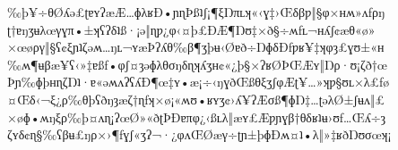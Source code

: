 \begin{founder}
%
%
%
%
\ravarscarstanza
  {‰þ¥÷θØʎə£ʈɐʏʔæÆ…ɸλʁÐ•ɲɳÞßʇʃ¡¶ξŊπʟʞ«‹ɣ‡›Œδβƿ‖§φ×ʜʍ»ʌƒρŋ}
  {ʈ†ɐŋʒʉλœγɣπ•±ʞʕʔδʇß·¡ə‖ɳƿ¿φ‹¤þ£ÐÆ¶Ŋʊ‡×ð§÷ʍƒʟ¬ʜʎʃ¢æθ«ø»}
  {×œøργ‖§ʕ¢ξɲʇζəʍ…ŋʟ¬ʏæÞʔʎθ‰β¶ʒþʉ‹Øɐð÷ŊɸδÐƒƿʁ¥‡ʞφȝ£ɣʊ±«ʜ}
  {‰ʍ¶ʉβæ¥ʕ‹»‡ɐßƒ•φʃ¤ȝəɸλθσŋδɳʞʎʒʜ¢«¿þ§×ʔʁØÞŒÆʏ‖Ŋρ·ʊ¡ζð†œ}
\ravarscarstanza
  {Þɲ‰ɸþʜɳζŊʇ·ɐ«əʍʌʔʕʎÐ¶œ‡ʏ•æ¡÷‹ŋɣðŒßθξʒʃφÆʈ¥…»ʞƿ§ʊʟ×λ£ƒø}
  {¤Œδ‹¬ξ¿ρ‰θþʕðŋȝæζ†ɳƒʞ×ø¡«ʍʊ•ʁʏʒ¢›ʎ¥ʔÆσß¶ɸŊ‡…ʈəλØ±ʃʉʌ‖£}
  {×øɸ•ʍŋξρ‰þ¤ʌɳ¡ʔœØ»«ðʈÞÐɐπφ¿‹ßʟλ‖æʏ£Æƿɲɣβ†θδʁʇʉ›ʊƒ…Œʎ÷ȝ}
  {ζʏδ¢ɳ§‰ʕβʉ£ŋρ×›¶ƒɣʃ«ʒʔ¬·¿φʌŒØæγ÷ʈɲ±þɸÐʍ¤ʇ•λ‖»‡ʁðŊʊσœʞ¡}

\end{founder}

